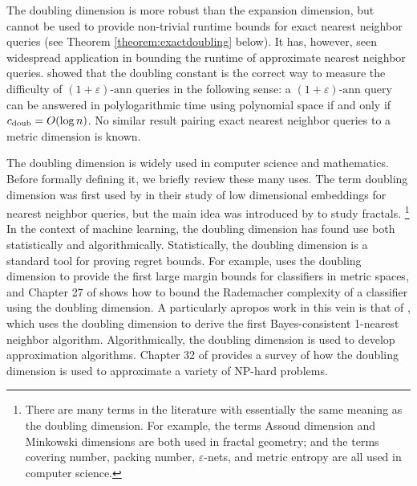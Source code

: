 \documentclass[thesis.tex]{subfiles}
\newcommand{\cdoub}{c_\textnormal{doub}}
\newcommand{\eann}{(1+\varepsilon)\text{-ann}}
\begin{document}
The doubling dimension is more robust than the expansion dimension,
but cannot be used to provide non-trivial runtime bounds for exact nearest neighbor queries (see Theorem \ref{theorem:exactdoubling} below).
It has, however, seen widespread application in bounding the runtime of approximate nearest neighbor queries.
\cite{krauthgamer2005black} showed that the doubling constant is the correct way to measure the difficulty of $\eann$ queries in the following sense:
a $\eann$ query can be answered in polylogarithmic time using polynomial space if and only if $\cdoub = O(\log n)$.
No similar result pairing exact nearest neighbor queries to a metric dimension is known.

The doubling dimension is widely used in computer science and mathematics.
Before formally defining it, we briefly review these many uses. 
The term doubling dimension was first used by \citet{gupta2003bounded} in their study of low dimensional embeddings for nearest neighbor queries,
but the main idea was introduced by \citet{assoud1979etude} to study fractals.%
\footnote{
    There are many terms in the literature with essentially the same meaning as the doubling dimension.
    For example, the terms Assoud dimension and Minkowski dimensions are both used in fractal geometry;
    and the terms covering number, packing number, $\varepsilon$-nets, and metric entropy are all used in computer science. 
}
In the context of machine learning, the doubling dimension has found use both statistically and algorithmically.
Statistically, the doubling dimension is a standard tool for proving regret bounds.
For example, \citet{luxburg2004distance} uses the doubling dimension to provide the first large margin bounds for classifiers in metric spaces,
and Chapter 27 of \cite{shalev2014understanding} shows how to bound the Rademacher complexity of a classifier using the doubling dimension.
A particularly apropos work in this vein is that of \citet{kontorovich2015bayes},
which uses the doubling dimension to derive the first Bayes-consistent 1-nearest neighbor algorithm.
Algorithmically, the doubling dimension is used to develop approximation algorithms.
Chapter 32 of \cite{toth2017handbook} provides a survey of how the doubling dimension is used to approximate a variety of NP-hard problems.
\end{document}
